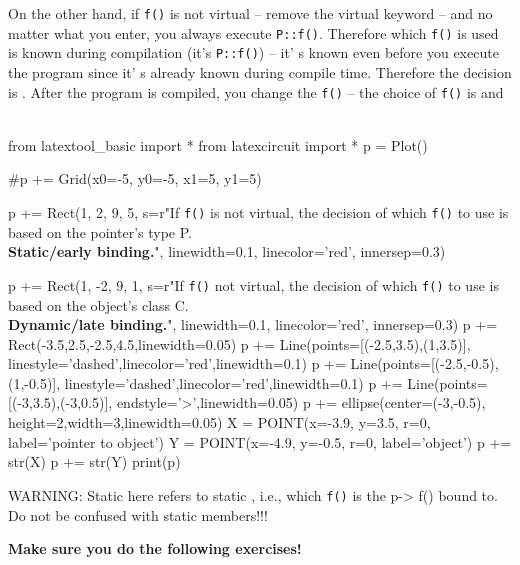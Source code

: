 On the other hand, if \verb!f()! is not virtual -- remove the virtual keyword -- and no matter what you enter, you always execute \verb!P::f()!. Therefore which \verb!f()! is used is known during compilation (it's \verb!P::f()!) -- it' s known even before you execute the program since it' s already known during compile time. Therefore the decision is . After the program is compiled, you  change the \verb!f()! -- the choice of \verb!f()! is  and 
\newpage
{}\\
\\
\begin{python}
from latextool_basic import *
from latexcircuit import *
p = Plot()

#p += Grid(x0=-5, y0=-5, x1=5, y1=5)

p += Rect(1, 2, 9, 5, s=r"If \texttt{f()} is not virtual, the decision of which \texttt{f()} to use is based on the pointer's type P.\\ \textbf{Static/early binding.}", linewidth=0.1, linecolor='red', innersep=0.3)

p += Rect(1, -2, 9, 1, s=r"If \texttt{f()} not virtual, the decision of which \texttt{f()} to use is based on the object's class C.\\ \textbf{Dynamic/late binding.}", linewidth=0.1, linecolor='red', innersep=0.3)
p += Rect(-3.5,2.5,-2.5,4.5,linewidth=0.05)
p += Line(points=[(-2.5,3.5),(1,3.5)], linestyle='dashed',linecolor='red',linewidth=0.1)
p += Line(points=[(-2.5,-0.5),(1,-0.5)], linestyle='dashed',linecolor='red',linewidth=0.1)
p += Line(points=[(-3,3.5),(-3,0.5)], endstyle='>',linewidth=0.05)
p += ellipse(center=(-3,-0.5), height=2,width=3,linewidth=0.05)
X = POINT(x=-3.9, y=3.5, r=0, label='pointer to object')
Y = POINT(x=-4.9, y=-0.5, r=0, label='object')
p += str(X)
p += str(Y)
print(p)
\end{python}
WARNING: Static here refers to static , i.e., which \verb!f()! is the p-> f() bound to. Do not be confused with static members!!!

\textbf{Make sure you do the following exercises!}


\newpage{}

